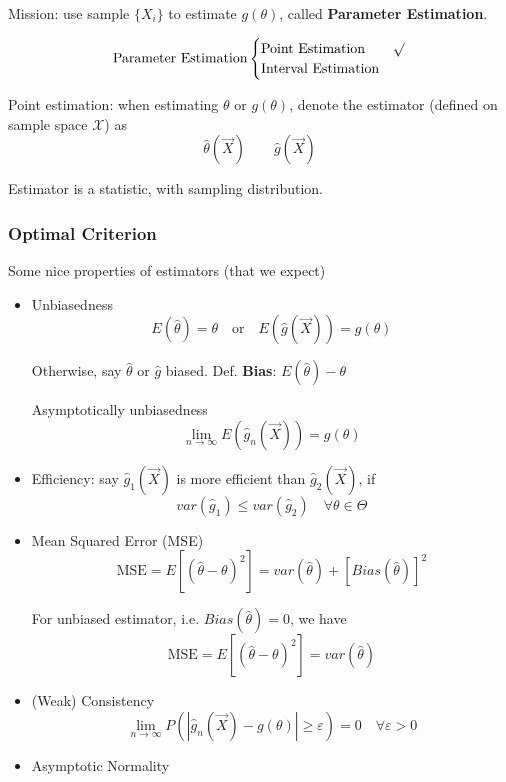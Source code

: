     Mission: use sample $\{X_i\}$ to estimate $g(\theta)$, called \textbf{Parameter Estimation}.

    \[
        \text{Parameter Estimation}\begin{cases}
            \text{Point Estimation}& \surd\\
            \text{Interval Estimation}&
        \end{cases}    
    \]

    Point estimation: when estimating $\theta$ or $g(\theta)$, denote the estimator (defined on sample space $\mathscr{X}$) as
    \[
        \hat{\theta}(\vec{X})\qquad \hat{g}(\vec{X})    
    \]

    Estimator is a statistic, with sampling distribution.
\subsubsection{Optimal Criterion}\label{SubSectionOptimalCriterion}
        Some nice properties of estimators (that we expect)
    \begin{itemize}
        \item Unbiasedness
        \[
            E(\hat{\theta})=\theta   \quad \text{or}\quad E(\hat{g}(\vec{X})) =g(\theta)
        \]

        Otherwise, say $\hat{\theta}$ or $\hat{g}$ biased. Def. \textbf{Bias}: $E(\hat{\theta})-\theta$

        Asymptotically unbiasedness
        \[
            \lim_{n\to\infty}  E(\hat{g}_n(\vec{X})) =g(\theta)  
        \]
        \item Efficiency: say $\hat{g}_1(\vec{X})$ is more efficient than $\hat{g}_2(\vec{X})$, if
        \[
            var(\hat{g}_1)\leq var(\hat{g}_2)  \quad\forall\theta\in\Theta  
        \]
        \item Mean Squared Error (MSE)
        \[
            \text{MSE}=E[(\hat{\theta}-\theta)^2]=var(\hat{\theta})+[Bias(\hat{\theta})]^2
        \]

        For unbiased estimator, i.e. $Bias(\hat{\theta})=0$, we have
        \[
            \text{MSE}=E[(\hat{\theta}-\theta)^2]=var(\hat{\theta})
        \]
        \item (Weak) Consistency
        \[
            \lim_{n\to\infty}P(|\hat{g}_n(\vec{X})-g(\theta)|\geq \varepsilon)=0\quad\forall\varepsilon>0    
        \]
        \item Asymptotic Normality
    \end{itemize}


